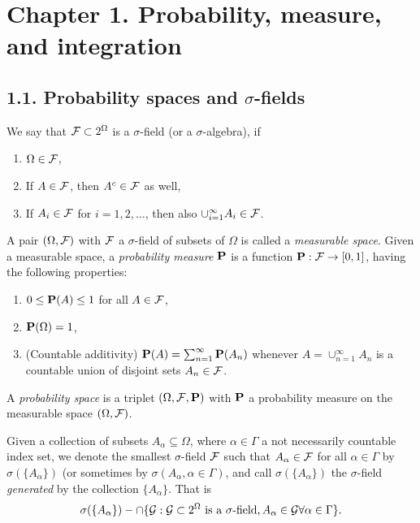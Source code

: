\section*{Chapter 1. Probability, measure, and integration}
\subsection*{1.1. Probability spaces and $\sigma$-fields}
\begin{definition*}
We say that $\mathcal{F} \subset 2^\Omega$ is a $\sigma$-field (or a $\sigma$-algebra), if
\begin{enumerate}[label=(\alph*)]
\item $\Omega \in \mathcal{F}$,
\item If $A \in \mathcal{F}$, then $A^c \in \mathcal{F}$ as well,
\item If $A_i \in \mathcal{F}$ for $i = 1, 2, \dots$, then also $\cup_{i=1}^\infty A_i
	\in \mathcal{F}$.
\end{enumerate}
\end{definition*} 

\begin{definition*}
A pair $(\Omega, \mathcal{F})$ with $\mathcal{F}$ a $\sigma$-field of subsets of $\Omega$ is
called a \emph{measurable space}. Given a measurable space, a \emph{probability
measure} $\mathbf{P}$ is a function $\mathbf{P}: \mathcal{F} \rightarrow [0, 1]$, having the following
properties:
\begin{enumerate}[label=(\alph*)]
\item $0 \le \mathbf{P}(A) \le 1$ for all $A \in \mathcal{F}$,
\item $\mathbf{P}(\Omega) = 1$,
\item (Countable additivity) $\mathbf{P}(A) = \sum_{n=1}^\infty \mathbf{P}(A_n)$ whenever $A =
\cup_{n=1}^\infty A_n$ is a countable union of disjoint sets $A_n \in \mathcal{F}$.
\end{enumerate}
A \emph{probability space} is a triplet $(\Omega, \mathcal{F}, \mathbf{P})$ with $\mathbf{P}$ a
probability measure on the measurable space $(\Omega, \mathcal{F})$.
\end{definition*} 

\begin{definition*}
Given a collection of subsets $A_\alpha \subseteq \Omega$, where $\alpha \in
\Gamma$ a not necessarily countable index set, we denote the smallest
$\sigma$-field $\mathcal{F}$ such that $A_\alpha \in \mathcal{F}$ for all $\alpha \in \Gamma$ by
$\sigma(\{A_\alpha\})$ (or sometimes by $\sigma(A_\alpha, \alpha \in \Gamma)$,
and call $\sigma(\{A_\alpha\})$ the $\sigma$-field \emph{generated} by the collection
$\{A_\alpha\}$. That is
\[
\sigma(\{A_\alpha\}) - \cap \{ \mathcal{G} : \mathcal{G} \subset 2^\Omega
\text{ is a $\sigma$-field}, A_\alpha \in \mathcal{G} \forall \alpha \in
\Gamma\}.
\] 
\end{definition*} 

